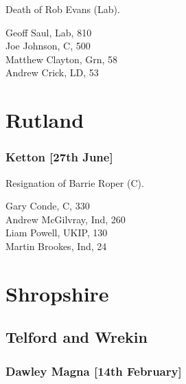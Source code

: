 \documentclass[a4paper,openany,10pt]{book}
\begin{document}

Death of Rob Evans (Lab).



Geoff Saul, Lab, 810\\
Joe Johnson, C, 500\\
Matthew Clayton, Grn, 58\\
Andrew Crick, LD, 53\\


\vfill

\section{Rutland}

\subsubsection*{Ketton \hspace*{\fill}\nolinebreak[1]%
\enspace\hspace*{\fill}
[27th June]}


Resignation of Barrie Roper (C).



Gary Conde, C, 330\\
Andrew McGilvray, Ind, 260\\
Liam Powell, UKIP, 130\\
Martin Brookes, Ind, 24\\


\vfill

\section{Shropshire}

\subsection*{Telford and Wrekin}

\subsubsection*{Dawley Magna \hspace*{\fill}\nolinebreak[1]%
\enspace\hspace*{\fill}
[14th February]}
\end{document}

